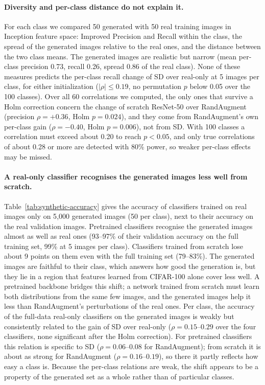 \documentclass{scrartcl}
\begin{document}
\paragraph{Diversity and per-class distance do not explain it.}
For each class we compared 50 generated with 50 real training images in Inception feature space:
Improved Precision and Recall within the class, the spread of the generated images relative to the real
ones, and the distance between the two class means. The generated images are realistic but narrow
(mean per-class precision 0.73, recall 0.26, spread 0.86 of the real class). None of these measures
predicts the per-class recall change of SD over real-only at 5 images per class, for either
initialization ($|\rho| \le 0.19$, no permutation $p$ below 0.05 over the 100 classes). Over all 60
correlations we computed, the only ones that survive a Holm correction concern the change
of scratch ResNet-50 over RandAugment (precision $\rho = +0.36$, Holm $p = 0.024$), and they come from
RandAugment's own per-class gain ($\rho = -0.40$, Holm $p = 0.006$), not from SD. With 100 classes a
correlation must exceed about 0.20 to reach $p < 0.05$, and only true correlations of about 0.28 or more
are detected with 80\% power, so weaker per-class effects may be missed.

\paragraph{A real-only classifier recognises the generated images less well from scratch.}
Table~\ref{tab:synthetic-accuracy} gives the accuracy of classifiers trained on real images only on
5{,}000 generated images (50 per class), next to their accuracy on the real validation images. Pretrained
classifiers recognise the generated images almost as well as real ones (93--97\% of their validation
accuracy on the full training set, 99\% at 5 images per class). Classifiers trained from scratch lose
about 9 points on them even with the full training set (79--83\%). The generated images are faithful to
their class, which answers how good the generation is, but they lie in a region that features learned
from CIFAR-100 alone cover less well. A pretrained backbone bridges this shift; a network trained from
scratch must learn both distributions from the same few images, and the generated images help it less
than RandAugment's perturbations of the real ones. Per class, the accuracy of the full-data real-only
classifiers on the generated images is weakly but consistently related to the gain of SD over real-only
($\rho = 0.15$--$0.29$ over the four classifiers, none significant after the Holm correction). For
pretrained classifiers this relation is specific to SD ($\rho = 0.06$--$0.08$ for RandAugment); from scratch
it is about as strong for RandAugment ($\rho = 0.16$--$0.19$), so there it partly reflects how easy a class
is. Because the per-class relations are weak, the shift appears to be a property of the generated set as a
whole rather than of particular classes.
\end{document}
